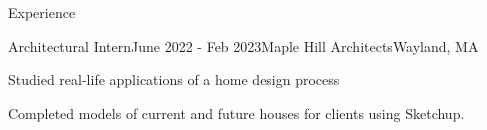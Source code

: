 \documentclass[
	a4paper, %
	9pt, %
]{resume} %
\begin{document}
\begin{rSection}{Experience}
%	




	\begin{rSubsection}{Architectural Intern}{June 2022 - Feb 2023}{Maple Hill Architects}{Wayland, MA}
		\item Studied real-life applications of a home design process
		\item Completed models of current and future houses for clients using Sketchup.
	\end{rSubsection}
\end{rSection}
\end{document}
